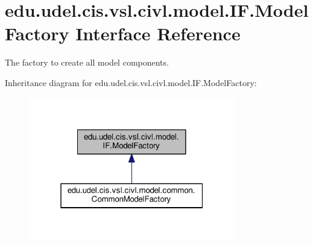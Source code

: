 \hypertarget{interfaceedu_1_1udel_1_1cis_1_1vsl_1_1civl_1_1model_1_1IF_1_1ModelFactory}{}\section{edu.\+udel.\+cis.\+vsl.\+civl.\+model.\+I\+F.\+Model\+Factory Interface Reference}
\label{interfaceedu_1_1udel_1_1cis_1_1vsl_1_1civl_1_1model_1_1IF_1_1ModelFactory}


The factory to create all model components.  




Inheritance diagram for edu.\+udel.\+cis.\+vsl.\+civl.\+model.\+I\+F.\+Model\+Factory\+:
\nopagebreak
\begin{figure}[H]
\begin{center}
\leavevmode
\includegraphics[width=256pt]{interfaceedu_1_1udel_1_1cis_1_1vsl_1_1civl_1_1model_1_1IF_1_1ModelFactory__inherit__graph}
\end{center}
\end{figure}
